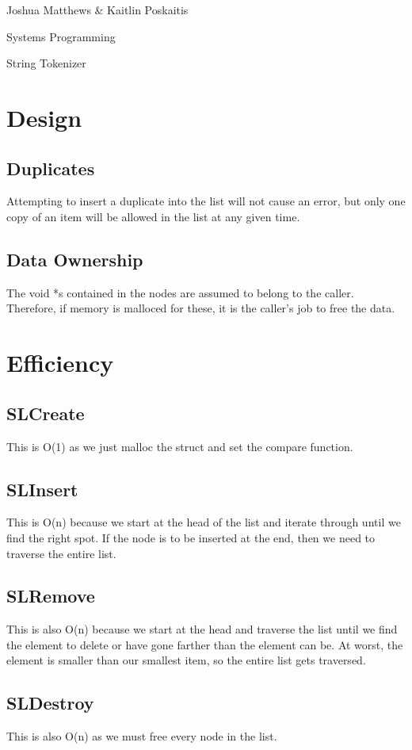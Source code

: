 \documentclass[letterpaper,12pt]{article}
\begin{document}
\noindent Joshua Matthews \& Kaitlin Poskaitis

\noindent Systems Programming

\noindent String Tokenizer

\section*{Design}
\subsection*{Duplicates}
Attempting to insert a duplicate into the list will not cause an error, but only
one copy of an item will be allowed in the list at any given time.

\subsection*{Data Ownership}
The void *s contained in the nodes are assumed to belong to the caller.
Therefore, if memory is malloced for these, it is the caller's job to free the
data.

\section*{Efficiency}
\subsection*{SLCreate}
This is O(1) as we just malloc the struct and set the compare function.

\subsection*{SLInsert}
This is O(n) because we start at the head of the list and iterate through until
we find the right spot. If the node is to be inserted at the end, then we need
to traverse the entire list.

\subsection*{SLRemove}
This is also O(n) because we start at the head and traverse the list until we
find the element to delete or have gone farther than the element can be. At
worst, the element is smaller than our smallest item, so the entire list gets
traversed.

\subsection*{SLDestroy}
This is also O(n) as we must free every node in the list.
\end{document}
